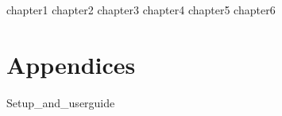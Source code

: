 \documentclass[12pt,a4paper]{report}
\begin{document}
\tableofcontents

{chapter1}
{chapter2}
{chapter3}
{chapter4}
{chapter5}
{chapter6}


\appendix
\chapter{Appendices}
{Setup_and_userguide}
\end{document}
